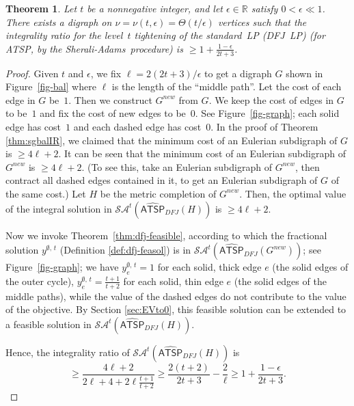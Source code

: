 \documentclass[11pt]{article}
\newtheorem{theorem}{Theorem}[section]
\newcommand{\sa}{\textsf{Sherali-Adams}}
\newcommand \reals {\mathbb{R}}
\newcommand{\atspdfjpolytope}{\widehat{\textsf{ATSP}}_{\mathit{DFJ}}}
\newcommand{\yvec}[2]{y^{#1,\,#2}}	\newcommand{\zvec}[2]{y^{#1,\,#2}}	\newcommand{\zveconly}{y}
\newcommand{\saop}{\mathcal{SA}}
\begin{document}
\begin{theorem}\label{thm:dfj-sgIR}
Let $t$ be a nonnegative integer, and let $\epsilon\in\reals$
satisfy $0<\epsilon\ll{1}$.
There exists a digraph on $\nu=\nu(t,\epsilon)=\Theta(t/\epsilon)$ vertices
such that the integrality ratio for
the level~$t$ tightening of the standard~LP (DFJ~LP)
(for ATSP, by the \sa\ procedure)
is $\geq 1+\frac{1-\epsilon}{2t+3}$.
\end{theorem}

\begin{proof}
Given $t$ and $\epsilon$, we
fix $\ell= 2 (2t+3)/\epsilon$ to get a digraph $G$ shown in
Figure~\ref{fig-bal} where $\ell$ is the length of the ``middle path''.
Let the cost of each  edge in $G$ be~$1$.
Then we construct $G^{new}$ from $G$.
We keep the cost of edges in $G$ to be~$1$ and fix
the cost of new edges to be~$0$.
See Figure~\ref{fig-graph}; each solid edge has cost~$1$ and
each dashed edge has cost~$0$.
In the proof of Theorem \ref{thm:sgbalIR}, we claimed that
the minimum cost of an Eulerian subdigraph of $G$ is $\geq 4\ell+2$.
It can be seen that the minimum cost of an Eulerian subdigraph of
$G^{new}$ is $\geq 4\ell+2$.
(To see this, take an Eulerian subdigraph of $G^{new}$,
then contract all dashed edges contained in it,
to get an Eulerian subdigraph of $G$ of the same cost.)
Let $H$ be the metric completion of $G^{new}$.
Then, the optimal value of the integral solution in
$\saop^t(\atspdfjpolytope(H))$ is $\geq 4\ell+2$.

Now we invoke Theorem~\ref{thm:dfj-feasible}, according to which
the fractional solution $\yvec{\emptyset}{t} $
(Definition \ref{def:dfj-feasol}) is in $\saop^t(\atspdfjpolytope(G^{new}))$;
see Figure~\ref{fig-graph};
we have
$\yvec{\emptyset}{t}_e=1$ for each solid, thick edge $e$
(the solid edges of the outer cycle),
$\yvec{\emptyset}{t}_e=\frac{t+1}{t+2}$ for each solid, thin edge $e$
(the solid edges of the middle paths), 
while the value of the dashed edges do not contribute to the value of the objective.
By Section \ref{sec:EVto0}, this feasible solution can
be extended to a feasible solution in $\saop^t(\atspdfjpolytope(H))$.



Hence, the integrality ratio of $\saop^t(\atspdfjpolytope(H))$ is
\[\geq \frac{4\ell + 2}{2\ell + 4 + 2\ell \frac{t+1}{t+2}} \ge
	\frac{2(t+2)}{2t+3} - \frac{2}{\ell} \ge
	1+ \frac{1 - \epsilon}{2t+3}.
\]
\end{proof}
\end{document}
